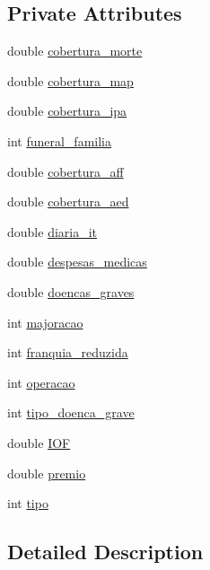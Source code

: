 \subsection*{Private Attributes}
\begin{DoxyCompactItemize}
\item 
double \hyperlink{class_produto_a37d0ef7fbcdce4de9c27911f85f7c0f1}{cobertura\+\_\+morte}
\item 
double \hyperlink{class_produto_ad9abc041cef9daa2abda343285df5a2e}{cobertura\+\_\+map}
\item 
double \hyperlink{class_produto_afb515e4bf63df7562d4c78e31ee79426}{cobertura\+\_\+ipa}
\item 
int \hyperlink{class_produto_a6fc727fd12d68f16a76fec4b9be086e7}{funeral\+\_\+familia}
\item 
double \hyperlink{class_produto_afaebf7dcd9c82cf945aa6cbbe8a5d571}{cobertura\+\_\+aff}
\item 
double \hyperlink{class_produto_ae013ae980573787067774ec14ec21459}{cobertura\+\_\+aed}
\item 
double \hyperlink{class_produto_afefb98ad26b77c674a14a3f4607db0e7}{diaria\+\_\+it}
\item 
double \hyperlink{class_produto_a9df2c3ba3304f3084e914a5a1f548645}{despesas\+\_\+medicas}
\item 
double \hyperlink{class_produto_ae09501fc8a8334a1af066660b16afeb7}{doencas\+\_\+graves}
\item 
int \hyperlink{class_produto_a0171a8d210819c3c3de0b8050ff6eff2}{majoracao}
\item 
int \hyperlink{class_produto_ac0793fa6348f5c77a66fd5cf916d964b}{franquia\+\_\+reduzida}
\item 
int \hyperlink{class_produto_a096269e399eb77578de837e329d3a052}{operacao}
\item 
int \hyperlink{class_produto_a2b89a8682a290751479f50c4c1ea1fa5}{tipo\+\_\+doenca\+\_\+grave}
\item 
double \hyperlink{class_produto_a3e278c2012c4cb6b1f8a89b381b90e4f}{I\+OF}
\item 
double \hyperlink{class_produto_ae9f4beb63c585a39767d4206cece7810}{premio}
\item 
int \hyperlink{class_produto_aace691096fd97d7ca03f5d9fab0270f7}{tipo}
\end{DoxyCompactItemize}


\subsection{Detailed Description}


